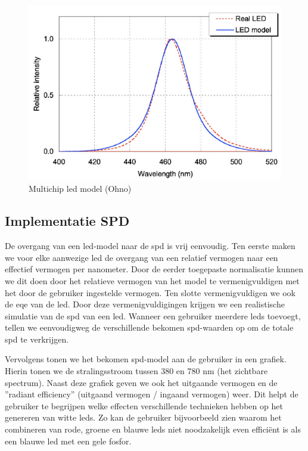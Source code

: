 \begin{figure}[H]
    \centering
    \includegraphics[width=0.8\linewidth]{figs/ohno.png}
    \caption{Multichip led model (Ohno)~\cite{ohnoSpectralDesignConsiderations2005}}%
    \label{fig:OhnoModel}
\end{figure}

\subsection{Implementatie SPD} %

De overgang van een \gls{led}-model naar de \gls{spd} is vrij eenvoudig. Ten eerste maken we voor elke aanwezige \gls{led} de overgang van een relatief vermogen naar een effectief vermogen per nanometer. Door de eerder toegepaste normalisatie kunnen we dit doen door het relatieve vermogen van het model te vermenigvuldigen met het door de gebruiker ingestelde vermogen. Ten slotte vermenigvuldigen we ook de \gls{eqe} van de \gls{led}. Door deze vermenigvuldigingen krijgen we een realistische simulatie van de \gls{spd} van een \gls{led}. Wanneer een gebruiker meerdere \gls{led}s toevoegt, tellen we eenvoudigweg de verschillende bekomen \gls{spd}-waarden op om de totale \gls{spd} te verkrijgen.

Vervolgens tonen we het bekomen \gls{spd}-model aan de gebruiker in een grafiek. Hierin tonen we de stralingsstroom tussen 380 en 780 nm (het zichtbare spectrum). Naast deze grafiek geven we ook het uitgaande vermogen en de ''radiant efficiency'' (uitgaand vermogen / ingaand vermogen) weer. Dit helpt de gebruiker te begrijpen welke effecten verschillende technieken hebben op het genereren van witte \gls{led}s. Zo kan de gebruiker bijvoorbeeld zien waarom het combineren van rode, groene en blauwe \gls{led}s niet noodzakelijk even effici\"ent is als een blauwe \gls{led} met een gele fosfor.

